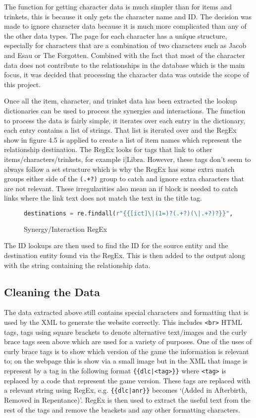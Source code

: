 The function for getting character data is much simpler than for items and trinkets, this is because it only gets the character name and ID. 
The decision was made to ignore character data because it is much more complicated than any of the other data types. The page for each character has 
a unique structure, especially for characters that are a combination of two characters such as Jacob and Esau or The Forgotten. Combined with the fact that 
most of the character data does not contribute to the relationships in the database which is the main focus, it was decided that processing the character data was outside 
the scope of this project. 

Once all the item, character, and trinket data has been extracted the lookup dictionaries can be used to process the synergies and interactions. 
The function to process the data is fairly simple, it iterates over each entry in the dictionary, each entry contains a list of strings. That list is iterated over 
and the RegEx show in figure 4.5 is applied to create a list of item names which represent the relationship destination. The RegEx looks for tags that link to other items/characters/trinkets,
for example {{i|Libra}}. However, these tags don't seem to always follow a set structure which is why the RegEx has some extra match groups either side of the \verb|(.+?)| group to catch and ignore extra 
characters that are not relevant. These irregularities also mean an if block is needed to catch links where the link text does not match the text in the title tag.
\begin{figure}[H]
    \begin{lstlisting}[language=Python]
        destinations = re.findall(r"{{[ict]\|(1=)?(.+?)(\|.+?)?}}", relationship[0], re.IGNORECASE)
    \end{lstlisting}
    \caption{Synergy/Interaction RegEx}
\end{figure}
The ID lookups are then used to find the ID for the source entity and the destination entity found via the RegEx. This is then added to the output along with the string containing the relationship data.
\subsection{Cleaning the Data}
The data extracted above still contains special characters and formatting that is used by the XML to generate the website correctly. 
This includes \verb|<br>| HTML tags, tags using square brackets to denote alternative text/images and the curly brace tags seen above which are used for a variety of purposes.
One of the uses of curly brace tags is to show which version of the game the information is relevant to; on the webpage this is show via a small image but in the XML
that image is represent by a tag in the following format \verb#{{dlc|<tag>}}# where \verb|<tag>| is replaced by a code that represent the game version.
These tags are replaced with a relevant string using RegEx, e.g. \verb#{{dlc|anr}}# becomes `(Added in Afterbirth, Removed in Repentance)'.
RegEx is then used to extract the useful text from the rest of the tags and remove the brackets and any other formatting characters.

